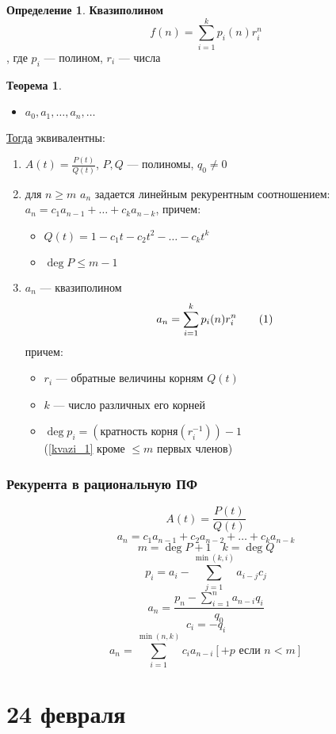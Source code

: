 \documentclass[oneside]{book}
\newcommand\addtag{\refstepcounter{equation}\tag{\theequation}}
\theoremstyle{plain}
\theoremstyle{remark}
\theoremstyle{definition}
\newtheorem{theorem}{Теорема}[section]
\newtheorem*{definition}{Определение}
\begin{document}
\begin{definition}
\textbf{Квазиполином}
\[ f(n) = \sum_{i = 1}^k p_i(n)r_i^n \], где \(p_i\) --- полином, \(r_i\) --- числа
\end{definition}
\begin{theorem}
\begin{itemize}
\item \(a_0, a_1, \dots, a_n, \dots\)
\end{itemize}
\uline{Тогда} эквивалентны:
\begin{enumerate}
\item \(A(t) = \frac{P(t)}{Q(t)}\), \(P, Q\) --- полиномы, \(q_0 \neq 0\)
\item для \(n \ge m\) \(a_n\) задается линейным рекурентным соотношением: \(a_n = c_1a_{n - 1} + \dots + c_ka_{n - k}\), причем:
\begin{itemize}
\item \(Q(t) = 1 - c_1t - c_2t^2 - \dots - c_kt^k\)
\item \(\deg P \le m - 1\)
\end{itemize}
\item \(a_n\) --- квазиполином \[ a_n = \sum_{i = 1}^k p_i(n)r_i^n \label{kvazi_1}\addtag \]
причем:
\begin{itemize}
\item \(r_i\) --- обратные величины корням \(Q(t)\)
\item \(k\) --- число различных его корней
\item \(\deg p_i = (\text{кратность корня}(r_i^{-1})) - 1\) \\
(\ref{kvazi_1} кроме \(\le m\) первых членов)
\end{itemize}
\end{enumerate}
\end{theorem}

\subsection{Рекурента в рациональную ПФ}
\label{sec:org0639718}
\[ A(t) = \frac{P(t)}{Q(t)} \]
\[ a_n = c_1 a_{n - 1} + c_2 a_{n - 2} + \dots + c_ka_{n - k} \]
\[ m = \deg P + 1\quad k = \deg Q \]
\[ p_i = a_i - \sum_{j = 1}^{\min(k, i)} a_{i - j} c_j \]
\[ a_n = \frac{p_n - \sum_{i = 1}^n a_{n - i}q_i}{q_0} \]
\[ c_i = -q_i \]
\[ a_n = \sum_{i = 1}^{\min(n, k)} c_i a_{n - i} [+ p\text{ если } n < m] \]
\chapter{24 февраля}
\label{sec:org8d5e7ee}
\end{document}
